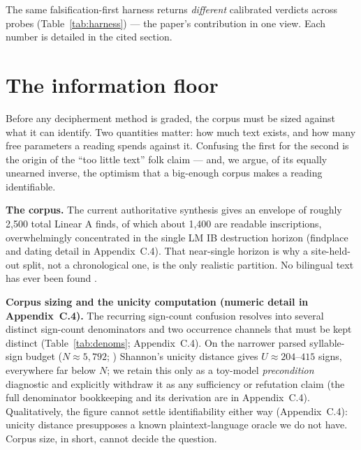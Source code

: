 The same falsification-first harness returns \emph{different} calibrated
verdicts across probes (Table~\ref{tab:harness}) --- the paper's
contribution in one view. Each number is detailed in the cited section.

\section{The information floor}

Before any decipherment method is graded, the corpus must be sized against
what it can identify. Two quantities matter: how much text exists, and how
many free parameters a reading spends against it. Confusing the first for
the second is the origin of the ``too little text'' folk claim --- and, we
argue, of its equally unearned inverse, the optimism that a big-enough
corpus makes a reading identifiable.

\textbf{The corpus.} The current authoritative synthesis
\citep{salgarella2025} gives an envelope of roughly 2,500 total Linear A
finds, of which about 1,400 are readable inscriptions, overwhelmingly
concentrated in the single LM IB destruction horizon (findplace and
dating detail in Appendix~C.4). That near-single horizon is why a
site-held-out split, not a chronological one, is the only realistic
partition. No bilingual text has ever been found
\citep[\S8]{salgarella2025}.

\textbf{Corpus sizing and the unicity computation (numeric detail in
Appendix~C.4).} The recurring sign-count confusion resolves into several
distinct sign-count denominators and two occurrence channels that must be
kept distinct (Table~\ref{tab:denoms}; Appendix~C.4). On the narrower parsed
syllable-sign budget ($N \approx 5{,}792$;
\citealp[\S1--3]{salgarella2025}) Shannon's unicity distance
gives $U \approx 204$--$415$ signs, everywhere far below $N$; we retain
this only as a toy-model \emph{precondition} diagnostic and explicitly
withdraw it as any sufficiency or refutation claim (the full denominator
bookkeeping and its derivation are in Appendix~C.4). Qualitatively, the
figure cannot settle identifiability either way (Appendix~C.4): unicity
distance presupposes a known plaintext-language oracle we do not have.
Corpus size, in short, cannot decide the question.

